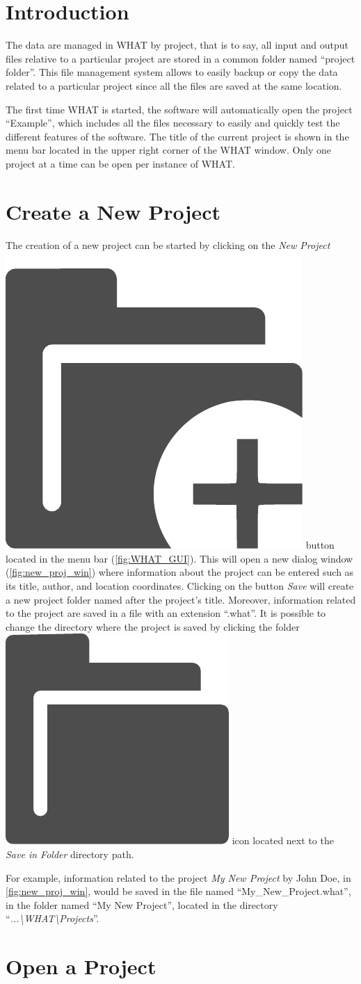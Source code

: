 \documentclass[WHATMANUAL.tex]{subfiles}
\begin{document}
\section{Introduction}

The data are managed in WHAT by project, that is to say, all input and output files relative to a particular project are stored in a common folder named ``project folder''. This file management system allows to easily backup or copy the data related to a particular project since all the files are saved at the same location.

The first time WHAT is started, the software will automatically open the project ``Example'', which includes all the files necessary to easily and quickly test the different features of the software. The title of the current project is shown in the menu bar located in the upper right corner of the WHAT window. Only one project at a time can be open per instance of WHAT.

\section{Create a New Project}

The creation of a new project can be started by clicking on the \emph{New Project}~{\includegraphics[height=2ex]{img/new_project}} button located in the menu bar (\cref{fig:WHAT_GUI}). This will open a new dialog window (\cref{fig:new_proj_win}) where information about the project can be entered such as its title, author, and location coordinates. Clicking on the button \emph{Save} will create a new project folder named after the project's title. Moreover, information related to the project are saved in a file with an extension ``.what''. It is possible to change the directory where the project is saved by clicking the folder~{\includegraphics[height=2ex]{img/folder}} icon located next to the \emph{Save in Folder} directory path.

For example, information related to the project \emph{My New Project} by John Doe, in \cref{fig:new_proj_win}, would be saved in the file named ``My\_New\_Project.what'', in the folder named ``My New Project'', located in the directory ``\textsl{...\textbackslash{}WHAT\textbackslash{}Projects}''.

\section{Open a Project}
\end{document}
